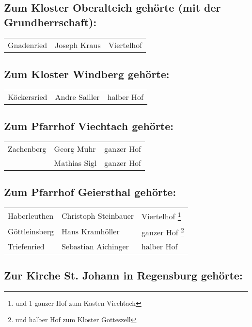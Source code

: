 \documentclass{book}
\begin{document}
\subsection{Zum Kloster Oberalteich gehörte (mit der Grundherrschaft):}

\begin{longtable}{l|l|l}
Gnadenried & Joseph Kraus & Viertelhof\\
\end{longtable}

\subsection{Zum Kloster Windberg gehörte:}

\begin{longtable}{l|l|l}
Köckersried & Andre Sailler & halber Hof\\
\end{longtable}

\subsection{Zum Pfarrhof Viechtach gehörte:}

\begin{longtable}{l|l|l}
Zachenberg & Georg Muhr & ganzer Hof\\
& Mathias Sigl & ganzer Hof\\
\end{longtable}

\subsection{Zum Pfarrhof Geiersthal gehörte:}

\begin{longtable}{l|l|l}
Haberleuthen & Christoph Steinbauer & Viertelhof \footnote{und 1 ganzer
Hof zum Kasten Viechtach}\\

Göttleinsberg & Hans Kramhöller & ganzer Hof \footnote{und halber Hof
zum Kloster Gotteszell}\\

Triefenried & Sebastian Aichinger & halber Hof\\
\end{longtable}

\subsection{Zur Kirche St. Johann in Regensburg gehörte:}
\end{document}
